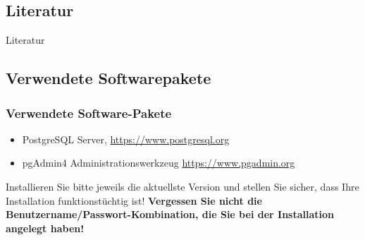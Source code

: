 \documentclass[xcolor,aspectratio=169,hyperref={bookmarks=false}]{beamer}
\newcommand{\thankyouframe}{\frame{\begin{center} \huge Vielen Dank für\\ Ihre Aufmerksamkeit!\end{center}}}
\begin{document}
\subsection*{Literatur}

\begin{frame}{Literatur}
\nocite{*}
\printbibliography
\end{frame}

\subsection*{Verwendete Softwarepakete}
\begin{frame}[t]\frametitle{Verwendete Software-Pakete}
	\begin{itemize}
		\item PostgreSQL Server,  \url{https://www.postgresql.org}
		\item pgAdmin4 Administrationswerkzeug \url{https://www.pgadmin.org}
	\end{itemize}
\vspace{3em}
\alert{Installieren Sie bitte jeweils die aktuellste Version und stellen Sie sicher, dass Ihre Installation 
	funktionstüchtig ist! \textbf{Vergessen Sie nicht die Benutzername/Passwort-Kombination, die Sie bei der Installation angelegt haben!}}
\end{frame}

%
%




















\end{document}
